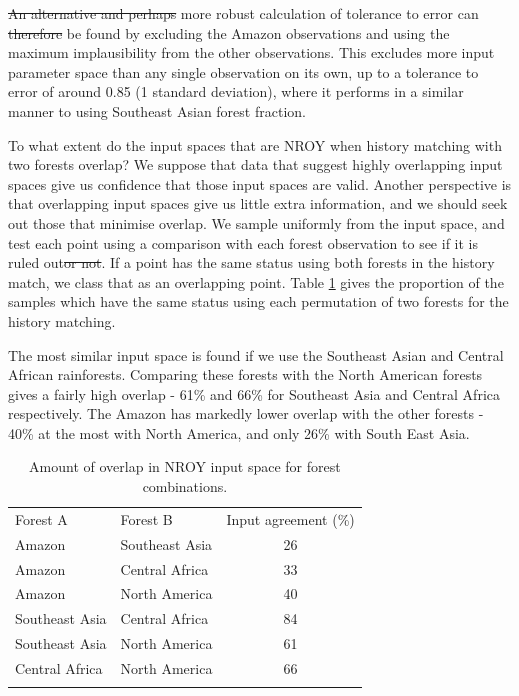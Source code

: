 \documentclass[esd, article]{copernicus} %
\providecommand{\DIFadd}[1]{{\protect\color{blue}\uwave{#1}}} %
\providecommand{\DIFdel}[1]{{\protect\color{red}\sout{#1}}}                      %
\providecommand{\DIFaddbegin}{} %
\providecommand{\DIFaddend}{} %
\providecommand{\DIFdelbegin}{} %
\providecommand{\DIFdelend}{} %
\begin{document}
\DIFdelbegin \DIFdel{An alternative and perhaps }\DIFdelend \DIFaddbegin \DIFadd{A }\DIFaddend more robust calculation of tolerance to error can \DIFdelbegin \DIFdel{therefore }\DIFdelend be found by excluding the Amazon observations and using the maximum implausibility from the other observations. This excludes more input parameter space than any single observation on its own, up to a tolerance to error of around 0.85 (1 standard deviation), where it performs in a similar manner to using Southeast Asian forest fraction.


To what extent do the input spaces that are NROY when history matching with two forests overlap? We suppose that data that suggest highly overlapping input spaces give us confidence that those input spaces are valid. Another perspective is that overlapping input spaces give us little extra information, and we should seek out those that minimise overlap. We sample uniformly from the input space, and test each point using a comparison with each forest observation to see if it is ruled out\DIFdelbegin \DIFdel{or not}\DIFdelend . If a point has the same status using both forests in the history match, we class that as an overlapping point. Table \ref{tab:input_overlap} gives the proportion of the samples which have the same status using each permutation of two forests for the history matching.

The most similar input space is found if we use the Southeast Asian and Central African rainforests. Comparing these forests with the North American forests gives a fairly high overlap - 61\% and 66\% for Southeast Asia and Central Africa respectively. The Amazon has markedly lower overlap with the other forests - 40\% at the most with North America, and only 26\% with South East Asia.


\begin{table}[t]
\caption{Amount of overlap in NROY input space for forest combinations.}\label{tab:input_overlap}
\begin{tabular}{llc}

\tophline
Forest A &  Forest B & Input agreement (\%) \\
Amazon & Southeast Asia & 26 \\
Amazon & Central Africa & 33 \\
Amazon & North America & 40 \\
Southeast Asia & Central Africa & 84 \\
Southeast Asia & North America & 61 \\
Central Africa  & North America & 66 \\
\bottomhline
\end{tabular}
\belowtable{} %
\end{table}
\end{document}
